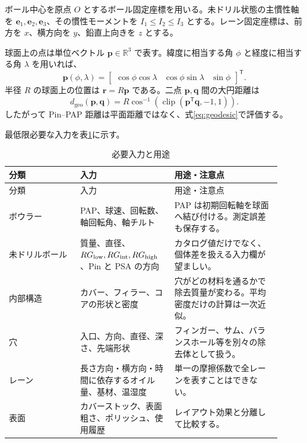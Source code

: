 \documentclass[11pt,a4paper]{article}
\newcommand{\vect}[1]{\bm{#1}}
\newcommand{\R}{\mathbb{R}}
\begin{document}
ボール中心を原点 $O$ とするボール固定座標を用いる。未ドリル状態の主慣性軸を
$\vect e_1,\vect e_2,\vect e_3$、その慣性モーメントを
$I_1\le I_2\le I_3$ とする。レーン固定座標は、前方を $x$、横方向を $y$、鉛直上向きを $z$ とする。

球面上の点は単位ベクトル $\vect p\in\R^3$ で表す。緯度に相当する角 $\phi$ と経度に相当する角 $\lambda$ を用いれば、
\begin{equation}
 \vect p(\phi,\lambda)=
 \begin{bmatrix}
 \cos\phi\cos\lambda & \cos\phi\sin\lambda & \sin\phi
 \end{bmatrix}^{\mathsf T}.
\end{equation}
半径 $R$ の球面上の位置は $\vect r=R\vect p$ である。二点 $\vect p,\vect q$ 間の大円距離は
\begin{equation}
 d_{\mathrm{geo}}(\vect p,\vect q)
 =R\cos^{-1}\!\left(\operatorname{clip}(\vect p^{\mathsf T}\vect q,-1,1)\right).
 \label{eq:geodesic}
\end{equation}
したがって Pin--PAP 距離は平面距離ではなく、式\eqref{eq:geodesic}で評価する。

最低限必要な入力を表\ref{tab:inputs}に示す。

\begin{longtable}{p{0.24\linewidth}p{0.31\linewidth}p{0.36\linewidth}}
\caption{必要入力と用途}\label{tab:inputs}\\
\toprule
分類 & 入力 & 用途・注意点\\
\midrule
\endfirsthead
\toprule
分類 & 入力 & 用途・注意点\\
\midrule
\endhead
ボウラー & PAP、球速、回転数、軸回転角、軸チルト & PAP は初期回転軸を球面へ結び付ける。測定誤差も保存する。\\
未ドリルボール & 質量、直径、$RG_{\rm low},RG_{\rm int},RG_{\rm high}$、Pin と PSA の方向 & カタログ値だけでなく、個体差を扱える入力欄が望ましい。\\
内部構造 & カバー、フィラー、コアの形状と密度 & 穴がどの材料を通るかで除去質量が変わる。平均密度だけの計算は一次近似。\\
穴 & 入口、方向、直径、深さ、先端形状 & フィンガー、サム、バランスホール等を別々の除去体として扱う。\\
レーン & 長さ方向・横方向・時間に依存するオイル量、基材、温湿度 & 単一の摩擦係数で全レーンを表すことはできない。\\
表面 & カバーストック、表面粗さ、ポリッシュ、使用履歴 & レイアウト効果と分離して比較する。\\
\bottomrule
\end{longtable}
\end{document}
